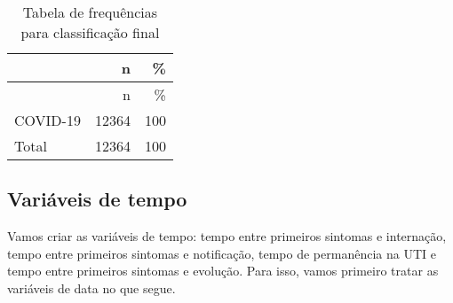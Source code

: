 \documentclass[
]{article}
\newenvironment{Shaded}{\begin{snugshade}}{\end{snugshade}}
\newcommand{\AttributeTok}[1]{\textcolor[rgb]{0.77,0.63,0.00}{#1}}
\newcommand{\CommentTok}[1]{\textcolor[rgb]{0.56,0.35,0.01}{\textit{#1}}}
\newcommand{\ConstantTok}[1]{\textcolor[rgb]{0.00,0.00,0.00}{#1}}
\newcommand{\DecValTok}[1]{\textcolor[rgb]{0.00,0.00,0.81}{#1}}
\newcommand{\FunctionTok}[1]{\textcolor[rgb]{0.00,0.00,0.00}{#1}}
\newcommand{\NormalTok}[1]{#1}
\newcommand{\SpecialCharTok}[1]{\textcolor[rgb]{0.00,0.00,0.00}{#1}}
\newcommand{\StringTok}[1]{\textcolor[rgb]{0.31,0.60,0.02}{#1}}
\begin{document}
\begin{Shaded}
\end{Shaded}

\begin{longtable}[]{@{}lrr@{}}
\caption{Tabela de frequências para classificação final}\tabularnewline
\toprule
& n & \% \\
\midrule
\endfirsthead
\toprule
& n & \% \\
\midrule
\endhead
COVID-19 & 12364 & 100 \\
Total & 12364 & 100 \\
\bottomrule
\end{longtable}

\hypertarget{variuxe1veis-de-tempo}{%
\subsection{Variáveis de tempo}\label{variuxe1veis-de-tempo}}

Vamos criar as variáveis de tempo: tempo entre primeiros sintomas e
internação, tempo entre primeiros sintomas e notificação, tempo de
permanência na UTI e tempo entre primeiros sintomas e evolução. Para
isso, vamos primeiro tratar as variáveis de data no que segue.
\end{document}
